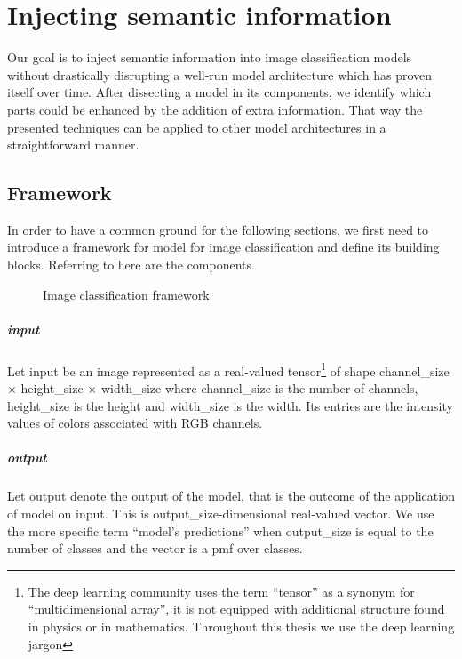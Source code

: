\chapter{Injecting semantic information}
\label{ch:injecting-semantic-information}

Our goal is to inject semantic information into image classification models
without drastically disrupting a well-run model architecture which has proven
itself over time. After dissecting a model in its components, we identify which
parts could be enhanced by the addition of extra information. That way the
presented techniques can be applied to other model architectures in a
straightforward manner.

\section{Framework}
\label{sec:framework}

In order to have a common ground for the following sections, we first need to
introduce a framework for model for image classification and define its building
blocks. Referring to  here are the components.

\begin{figure}[htbp]
  \caption{Image classification framework}
  \label{fig:03/framework}
\end{figure}

\paragraph{input} Let \gls{input} be an image represented as a real-valued
tensor\footnote{The deep learning community uses the term ``tensor'' as a
synonym for ``multidimensional array'', it is not equipped with additional
structure found in physics or in mathematics. Throughout this thesis we use
the deep learning jargon} of shape \gls{channel_size} $\times$ \gls{height_size}
$\times$ \gls{width_size} where \gls{channel_size} is the number of channels,
\gls{height_size} is the height and \gls{width_size} is the width. Its entries
are the intensity values of colors associated with RGB channels.

\paragraph{output} Let \gls{output} denote the output of the model, that is the
outcome of the application of \gls{model} on \gls{input}. This is
\gls{output_size}-dimensional real-valued vector. We use the more specific term
``model's predictions'' when \gls{output_size} is equal to the number of
classes and the vector is a \acrfull{pmf} over classes.

